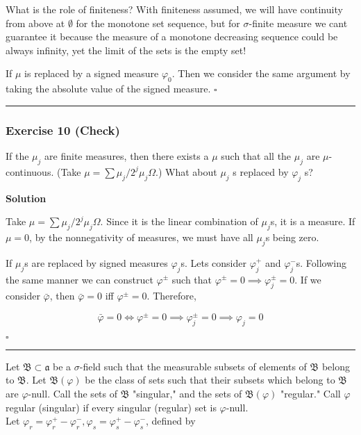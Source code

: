 \documentclass[
]{article}
\begin{document}
What is the role of finiteness? With finiteness assumed, we will have
continuity from above at \(\emptyset\) for the monotone set sequence,
but for \(\sigma\)-finite measure we can\textquotesingle t guarantee it
because the measure of a monotone decreasing sequence could be always
infinity, yet the limit of the sets is the empty set!

If \(\mu\) is replaced by a signed measure \(\varphi_0\). Then we
consider the same argument by taking the absolute value of the signed
measure. \(\square\)

\begin{center}\rule{0.5\linewidth}{0.5pt}\end{center}

\hypertarget{exercise-10-check}{%
  \subsubsection{Exercise 10 (Check)}\label{exercise-10-check}}

If the \(\mu_j\) are finite measures, then there exists a \(\mu\) such
that all the \(\mu_j\) are \(\mu\)-continuous. (Take
\(\mu=\sum \mu_j / 2^j \mu_j \Omega\).) What about \(\mu_j\)
\textquotesingle s replaced by \(\varphi_j\) \textquotesingle s?

\textbf{Solution}

Take \(\mu=\sum \mu_j / 2^j \mu_j \Omega\). Since it is the linear
combination of \(\mu_j\)\textquotesingle s, it is a measure. If
\(\mu = 0\), by the nonnegativity of measures, we must have all
\(\mu_j\)\textquotesingle s being zero.

If \(\mu_j\)\textquotesingle s are replaced by signed measures
\(\varphi_j\)\textquotesingle s. Let\textquotesingle s consider
\(\varphi_j^+\) and \(\varphi_j^-\)\textquotesingle s. Following the
same manner we can construct \(\varphi^\pm\) such that
\(\varphi^\pm = 0 \implies \varphi_j^\pm = 0\). If we consider
\(\bar \varphi\), then \(\bar\varphi = 0\) iff \(\varphi^\pm = 0\).
Therefore,

\[\bar\varphi = 0\iff \varphi^\pm = 0 \implies \varphi_j^{\pm} = 0 \implies \varphi_j = 0\]

\(\square\)

\begin{center}\rule{0.5\linewidth}{0.5pt}\end{center}

Let \(\mathfrak B \subset \mathfrak{a}\) be a \(\sigma\)-field such that
the measurable subsets of elements of \(\mathfrak B\) belong to
\(\mathfrak B\). Let \(\mathfrak B(\varphi)\) be the class of sets such
that their subsets which belong to \(\mathfrak B\) are \(\varphi\)-null.
Call the sets of \(\mathfrak B\) "singular," and the sets of
\(\mathfrak B(\varphi)\) "regular." Call \(\varphi\) regular (singular)
if every singular (regular) set is \(\varphi\)-null.\\
Let
\(\varphi_r=\varphi_r^{+}-\varphi_r^{-}, \varphi_s=\varphi_s^{+}-\varphi_s^{-}\),
defined by
\end{document}
